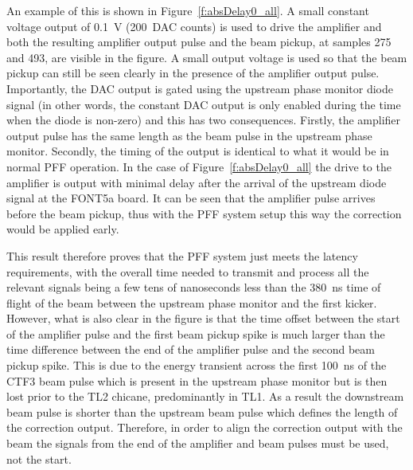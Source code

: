 An example of this is shown in Figure~\ref{f:absDelay0_all}. A small constant voltage output of 0.1~V (200~DAC counts) is used to drive the amplifier and both the resulting amplifier output pulse and the beam pickup, at samples 275 and 493, are visible in the figure. A small output voltage is used so that the beam pickup can still be seen clearly in the presence of the amplifier output pulse. Importantly, the DAC output is gated using the upstream phase monitor diode signal (in other words, the constant DAC output is only enabled during the time when the diode is non-zero) and this has two consequences. Firstly, the amplifier output pulse has the same length as the beam pulse in the upstream phase monitor. Secondly, the timing of the output is identical to what it would be in normal PFF operation. In the case of Figure~\ref{f:absDelay0_all} the drive to the amplifier is output with minimal delay after the arrival of the upstream diode signal at the FONT5a board. It can be seen that the amplifier pulse arrives before the beam pickup, thus with the PFF system setup this way the correction would be applied early. 

This result therefore proves that the PFF system just meets the latency requirements, with the overall time needed to transmit and process all the relevant signals being a few tens of nanoseconds less than the 380~ns time of flight of the beam between the upstream phase monitor and the first kicker. However, what is also clear in the figure is that the time offset between the start of the amplifier pulse and the first beam pickup spike is much larger than the time difference between the end of the amplifier pulse and the second beam pickup spike. This is due to the energy transient across the first 100~ns of the CTF3 beam pulse which is present in the upstream phase monitor but is then lost prior to the TL2 chicane, predominantly in TL1. As a result the downstream beam pulse is shorter than the upstream beam pulse which defines the length of the correction output. Therefore, in order to align the correction output with the beam the signals from the end of the amplifier and beam pulses must be used, not the start.

